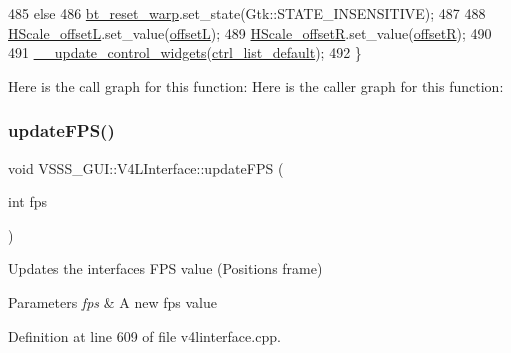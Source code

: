 \begin{DoxyCode}
485         \textcolor{keywordflow}{else}
486             \hyperlink{class_v_s_s_s___g_u_i_1_1_v4_l_interface_af7e670a295f186a699859a285ea1cdbb}{bt\_reset\_warp}.set\_state(Gtk::STATE\_INSENSITIVE);
487 
488         \hyperlink{class_v_s_s_s___g_u_i_1_1_v4_l_interface_a7261b87cb8ad1293c79003c48c99558a}{HScale\_offsetL}.set\_value(\hyperlink{class_v_s_s_s___g_u_i_1_1_v4_l_interface_a4e43fc5295bdec46e8e2fd24bf719e0b}{offsetL});
489         \hyperlink{class_v_s_s_s___g_u_i_1_1_v4_l_interface_a50fa202e4b9ec95b2c009a324aea10fb}{HScale\_offsetR}.set\_value(\hyperlink{class_v_s_s_s___g_u_i_1_1_v4_l_interface_a8bb9caa477b417f549198ea059375f06}{offsetR});
490 
491         \hyperlink{class_v_s_s_s___g_u_i_1_1_v4_l_interface_afbb5daccfdce20180578025c108ef65b}{\_\_update\_control\_widgets}(\hyperlink{class_v_s_s_s___g_u_i_1_1_v4_l_interface_a97faf21f7b67c8ef15ceeafa377c6ea4}{ctrl\_list\_default});
492     \}
\end{DoxyCode}
Here is the call graph for this function\+:
Here is the caller graph for this function\+:
\mbox{\label{class_v_s_s_s___g_u_i_1_1_v4_l_interface_a13330b40a7cbd68c2ed4a244f0726810}} 
\subsubsection{\texorpdfstring{update\+F\+P\+S()}{updateFPS()}}
{\footnotesize\ttfamily void V\+S\+S\+S\+\_\+\+G\+U\+I\+::\+V4\+L\+Interface\+::update\+F\+PS (\begin{DoxyParamCaption}\item[{int}]{fps }\end{DoxyParamCaption})}



Updates the interface\textquotesingle{}s F\+PS value (Positions frame) 


\begin{DoxyParams}{Parameters}
{\em fps} & A new fps value \\
\hline
\end{DoxyParams}


Definition at line 609 of file v4linterface.\+cpp.



